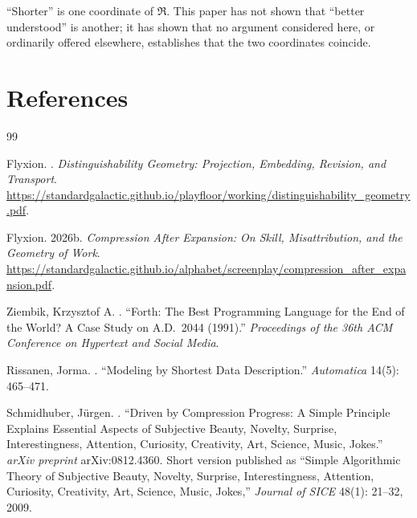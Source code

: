 \documentclass[11pt]{article}
\theoremstyle{plain}
\begin{document}
\begin{center}
\end{center}

``Shorter'' is one coordinate of $\mathfrak{R}$. This paper has not shown that ``better understood'' is another; it has shown that no argument considered here, or ordinarily offered elsewhere, establishes that the two coordinates coincide.

\newpage
\section*{References}

{\renewcommand{\refname}{}
\begin{thebibliography}{99}

Flyxion.
.
\newblock \emph{Distinguishability Geometry: Projection, Embedding, Revision, and Transport}.
\newblock \url{https://standardgalactic.github.io/playfloor/working/distinguishability_geometry.pdf}.

Flyxion.
\newblock 2026b.
\newblock \emph{Compression After Expansion: On Skill, Misattribution, and the Geometry of Work}.
\newblock \url{https://standardgalactic.github.io/alphabet/screenplay/compression_after_expansion.pdf}.

Ziembik, Krzysztof A.
.
\newblock ``Forth: The Best Programming Language for the End of the World? A Case Study on A.D.\ 2044 (1991).''
\newblock \emph{Proceedings of the 36th ACM Conference on Hypertext and Social Media}.

Rissanen, Jorma.
.
\newblock ``Modeling by Shortest Data Description.''
\newblock \emph{Automatica} 14(5): 465--471.

Schmidhuber, J\"urgen.
.
\newblock ``Driven by Compression Progress: A Simple Principle Explains Essential Aspects of Subjective Beauty, Novelty, Surprise, Interestingness, Attention, Curiosity, Creativity, Art, Science, Music, Jokes.''
\newblock \emph{arXiv preprint} arXiv:0812.4360.
\newblock Short version published as ``Simple Algorithmic Theory of Subjective Beauty, Novelty, Surprise, Interestingness, Attention, Curiosity, Creativity, Art, Science, Music, Jokes,'' \emph{Journal of SICE} 48(1): 21--32, 2009.


\end{thebibliography}}
\end{document}
